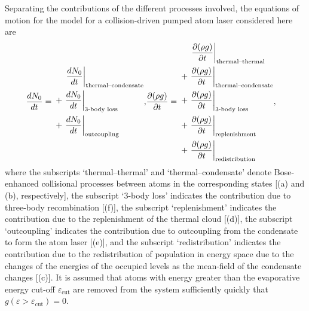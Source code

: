 Separating the contributions of the different processes involved, the equations of motion for the model for a collision-driven pumped atom laser considered here are
\begin{align}
    \frac{d N_0}{d t} =\begin{split}
        &\relphantom{+}\left. \frac{d N_0}{d t}\right|_\text{thermal--condensate} \\
        &+\left. \frac{d N_0}{d t}\right|_\text{3-body loss} \\
        &+\left. \frac{d N_0}{d t}\right|_\text{outcoupling}
    \end{split},
    & \frac{\partial (\rho g)}{\partial t} = \begin{split}
        &\relphantom{+}\left. \frac{\partial (\rho g)}{\partial t}\right|_\text{thermal--thermal} \\
        &+\left. \frac{\partial (\rho g)}{\partial t}\right|_\text{thermal--condensate} \\
        &+\left. \frac{\partial (\rho g)}{\partial t}\right|_\text{3-body loss} \\
        &+\left. \frac{\partial (\rho g)}{\partial t}\right|_\text{replenishment} \\
        &+\left. \frac{\partial (\rho g)}{\partial t}\right|_\text{redistribution}
    \end{split},
    \label{KineticTheory:EvolutionEquations}
\end{align}
where the subscripts `thermal--thermal' and `thermal--condensate' denote Bose-enhanced collisional processes between atoms in the corresponding states [(a) and (b), respectively], the subscript `3-body loss' indicates the contribution due to three-body recombination [(f)], the subscript `replenishment' indicates the contribution due to the replenishment of the thermal cloud [(d)], the subscript `outcoupling' indicates the contribution due to outcoupling from the condensate to form the atom laser [(e)], and the subscript `redistribution' indicates the contribution due to the redistribution of population in energy space due to the changes of the energies of the occupied levels as the mean-field of the condensate changes [(c)]. It is assumed that atoms with energy greater than the evaporative energy cut-off $\varepsilon_\text{cut}$ are removed from the system sufficiently quickly that  $g(\varepsilon > \varepsilon_\text{cut}) = 0$.


